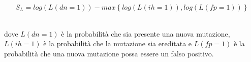 \documentclass[../main.tex]{subfiles}
\begin{document}
$$S_L = log \left(L\left(dn=1\right)\right) - max\left\lbrace log\left(L\left(ih=1\right)\right), log\left(L\left(fp=1\right)\right)\right\rbrace$$

\noindent
\\
dove $L\left(dn=1\right)$ è la probabilità che sia presente una nuova mutazione, $L\left(ih=1\right)$ è la probabilità che la mutazione sia ereditata e $L\left(fp=1\right)$ è la probabilità che una nuova mutazione possa essere un falso positivo.

%
%
\end{document}
